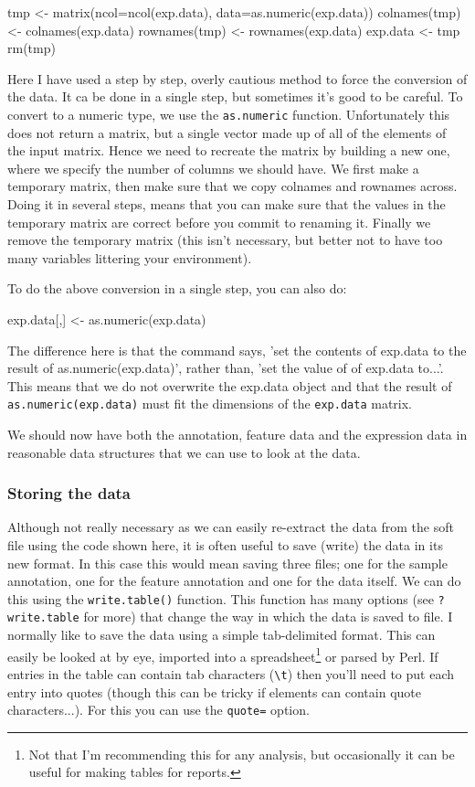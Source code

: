 \documentclass[11pt]{article}
\begin{document}
\begin{rcode}
  tmp <- matrix(ncol=ncol(exp.data), data=as.numeric(exp.data))
  colnames(tmp) <- colnames(exp.data)
  rownames(tmp) <- rownames(exp.data)
  exp.data <- tmp
  rm(tmp)
\end{rcode}

Here I have used a step by step, overly cautious method to force the conversion of the
data. It ca be done in a single step, but sometimes it's good to be
careful. To convert to a numeric type, we use the \texttt{as.numeric} function.
Unfortunately this does not return a matrix, but a single vector made up of
all of the elements of the input matrix. Hence we need to recreate the matrix
by building a new one, where we specify the number of columns we should have.
We first make a temporary matrix, then make sure that we copy colnames
and rownames across. Doing it in several steps, means that you can make sure
that the values in the temporary matrix are correct before you commit to renaming
it. Finally we remove the temporary matrix (this isn't necessary, but better not
to have too many variables littering your environment).

To do the above conversion in a single step, you can also do:

\begin{rcode}
exp.data[,] <- as.numeric(exp.data)
\end{rcode}

The difference here is that the command says, 'set the contents of exp.data
to the result of as.numeric(exp.data)', rather than, 'set the value of of
exp.data to...'. This means that we do not overwrite the exp.data object
and that the result of \texttt{as.numeric(exp.data)} must fit the dimensions
of the \texttt{exp.data} matrix. 

We should now have both the annotation, feature data and the expression
data in reasonable data structures that we can use to look at the data.

\subsubsection{Storing the data}
\label{sec-1-2-3}
Although not really necessary as we can easily re-extract the
data from the soft file using the code shown here, it is often
useful to save (write) the data in its new format. In this case
this would mean saving three files; one for the sample annotation,
one for the feature annotation and one for the data itself.
We can do this using the \texttt{write.table()} function. This
function has many options (see \texttt{?write.table} for more)
that change the way in which the data is saved to file. I normally
like to save the data using a simple tab-delimited format. This
can easily be looked at by eye, imported into a spreadsheet\footnote{
Not that I'm recommending this for any analysis, but occasionally
it can be useful for making tables for reports.} or parsed
by Perl. If entries in the table can contain tab characters (\verb|\t|)
then you'll need to put each entry into quotes (though this can
be tricky if elements can contain quote characters...). For this you can
use the \texttt{quote=} option.
\end{document}

